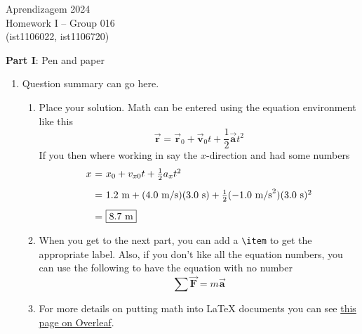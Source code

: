 \documentclass[12pt]{article}
\begin{document}
\center
Aprendizagem 2024\\
Homework I -- Group 016\\
(ist1106022, ist1106720)\vskip 1cm

\large{\textbf{Part I}: Pen and paper}\normalsize

\begin{enumerate}[leftmargin=\labelsep]
    \item Question summary can go here.
          \begin{enumerate}
              \item Place your solution. Math can be entered using the equation
                    environment like this
                    \begin{equation}
                        \vec{\mathbf{r}} = \vec{\mathbf{r}}_{0} + \vec{\mathbf{v}}_{0}t + \frac{1}{2}\vec{\mathbf{a}}t^{2}
                    \end{equation}
                    If you then where working in say the $x$-direction and had some numbers %
                    \begin{equation}
                        \begin{array}{r@{~=~}l}
                            x & x_{0} + v_{x0}t + \frac{1}{2}a_{x}t^{2}                                                            \\ [2ex]
                              & 1.2~\text{m} + (4.0~\text{m/s})(3.0~\text{s}) + \frac{1}{2}(-1.0~\text{m/s}^{2})(3.0~\text{s})^{2} \\ [2ex]
                              & \boxed{8.7~\text{m}}
                        \end{array}
                    \end{equation}

              \item When you get to the next part, you can add a \verb"\item" to get the appropriate label. Also,
                    if you don't like all the equation numbers, you can use the following to have the equation with
                    no number
                    \begin{equation*}
                        \sum\vec{\mathbf{F}} = m\vec{\mathbf{a}}
                    \end{equation*}

              \item For more details on putting math into {\LaTeX} documents you can see
                    \href{https://www.overleaf.com/learn/latex/Mathematical_expressions}{this page on Overleaf}.
          \end{enumerate}


\end{enumerate}
\end{document}
